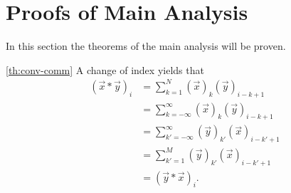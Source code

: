 \documentclass[a4paper, openany, oneside]{memoir}
\begin{document}
\section{Proofs of Main Analysis}
In this section the theorems of the main analysis will be proven.

\begin{blockProofTheorem}{\ref{th:conv-comm}}
    A change of index yields that
    \begin{align*}
        (\vec{x} \ast \vec{y})_i &= \sum_{k=1}^{N} (\vec{x})_k (\vec{y})_{i-k+1} \\
        &= \sum_{k=-\infty}^{\infty} (\vec{x})_k (\vec{y})_{i-k+1} \\
        &= \sum_{k'=-\infty}^{\infty} (\vec{y})_{k'} (\vec{x})_{i-k'+1} \\
        &= \sum_{k'=1}^{M} (\vec{y})_{k'} (\vec{x})_{i-k'+1} \\
        &= (\vec{y} \ast \vec{x})_i.
    \end{align*}
\end{blockProofTheorem}
\end{document}
